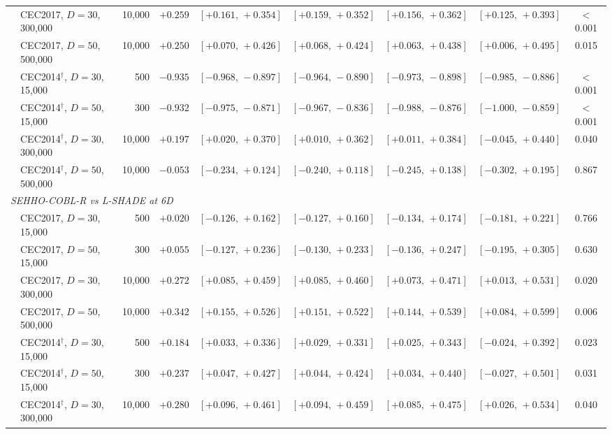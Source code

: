 \begin{table}[htbp]
{\begin{tabular}{llrrccccc}
\quad & CEC2017, $D{=}30$, 300{,}000 & 10{,}000 & $+0.259$ & $[+0.161,\,+0.354]$ & $[+0.159,\,+0.352]$ & $[+0.156,\,+0.362]$ & $[+0.125,\,+0.393]$ & $<$0.001 \\
\quad & CEC2017, $D{=}50$, 500{,}000 & 10{,}000 & $+0.250$ & $[+0.070,\,+0.426]$ & $[+0.068,\,+0.424]$ & $[+0.063,\,+0.438]$ & $[+0.006,\,+0.495]$ & 0.015 \\
\quad & CEC2014$^{\dagger}$, $D{=}30$, 15{,}000 & 500 & $-0.935$ & $[-0.968,\,-0.897]$ & $[-0.964,\,-0.890]$ & $[-0.973,\,-0.898]$ & $[-0.985,\,-0.886]$ & $<$0.001 \\
\quad & CEC2014$^{\dagger}$, $D{=}50$, 15{,}000 & 300 & $-0.932$ & $[-0.975,\,-0.871]$ & $[-0.967,\,-0.836]$ & $[-0.988,\,-0.876]$ & $[-1.000,\,-0.859]$ & $<$0.001 \\
\quad & CEC2014$^{\dagger}$, $D{=}30$, 300{,}000 & 10{,}000 & $+0.197$ & $[+0.020,\,+0.370]$ & $[+0.010,\,+0.362]$ & $[+0.011,\,+0.384]$ & $[-0.045,\,+0.440]$ & 0.040 \\
\quad & CEC2014$^{\dagger}$, $D{=}50$, 500{,}000 & 10{,}000 & $-0.053$ & $[-0.234,\,+0.124]$ & $[-0.240,\,+0.118]$ & $[-0.245,\,+0.138]$ & $[-0.302,\,+0.195]$ & 0.867 \\
\multicolumn{9}{l}{\emph{SEHHO-COBL-R vs L-SHADE at 6D}} \\
\quad & CEC2017, $D{=}30$, 15{,}000 & 500 & $+0.020$ & $[-0.126,\,+0.162]$ & $[-0.127,\,+0.160]$ & $[-0.134,\,+0.174]$ & $[-0.181,\,+0.221]$ & 0.766 \\
\quad & CEC2017, $D{=}50$, 15{,}000 & 300 & $+0.055$ & $[-0.127,\,+0.236]$ & $[-0.130,\,+0.233]$ & $[-0.136,\,+0.247]$ & $[-0.195,\,+0.305]$ & 0.630 \\
\quad & CEC2017, $D{=}30$, 300{,}000 & 10{,}000 & $+0.272$ & $[+0.085,\,+0.459]$ & $[+0.085,\,+0.460]$ & $[+0.073,\,+0.471]$ & $[+0.013,\,+0.531]$ & 0.020 \\
\quad & CEC2017, $D{=}50$, 500{,}000 & 10{,}000 & $+0.342$ & $[+0.155,\,+0.526]$ & $[+0.151,\,+0.522]$ & $[+0.144,\,+0.539]$ & $[+0.084,\,+0.599]$ & 0.006 \\
\quad & CEC2014$^{\dagger}$, $D{=}30$, 15{,}000 & 500 & $+0.184$ & $[+0.033,\,+0.336]$ & $[+0.029,\,+0.331]$ & $[+0.025,\,+0.343]$ & $[-0.024,\,+0.392]$ & 0.023 \\
\quad & CEC2014$^{\dagger}$, $D{=}50$, 15{,}000 & 300 & $+0.237$ & $[+0.047,\,+0.427]$ & $[+0.044,\,+0.424]$ & $[+0.034,\,+0.440]$ & $[-0.027,\,+0.501]$ & 0.031 \\
\quad & CEC2014$^{\dagger}$, $D{=}30$, 300{,}000 & 10{,}000 & $+0.280$ & $[+0.096,\,+0.461]$ & $[+0.094,\,+0.459]$ & $[+0.085,\,+0.475]$ & $[+0.026,\,+0.534]$ & 0.040 \\

\end{tabular}}
\end{table}
